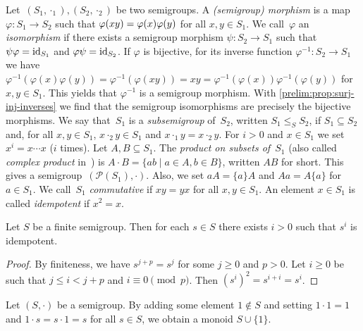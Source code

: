 \label{def:subsemigroup}
\label{def:product_subsets} 
Let~$(S_1,\cdot_1), (S_2,\cdot_2)$ be two semigroups. 
A \emph{(semigroup) morphism} 
is a map $\varphi \colon S_1 \to S_2$ such that $\varphi(xy) = \varphi(x) \varphi(y)$ 
for all $x,y \in S_1$. We call~$\varphi$ an \emph{isomorphism} if there exists a semigroup morphism
$\psi \colon S_2 \to S_1$ such that $\psi \varphi = \operatorname{id}_{S_1}$
and $\varphi \psi = \operatorname{id}_{S_2}$.
If $\varphi$ is bijective, for its inverse function $\varphi^{-1} \colon S_2 \to S_1$
we have $\varphi^{-1}(\varphi(x)\varphi(y))
= \varphi^{-1}(\varphi(xy)) = xy = \varphi^{-1}(\varphi(x)) \varphi^{-1}(\varphi(y))$ for $x,y \in S_1$.
This yields that $\varphi^{-1}$ is a semigroup morphism.
With \cref{prelim:prop:surj-inj-inverses} 
we find that the semigroup isomorphisms are precisely the bijective morphisms.
We say that~$S_1$ is a \emph{subsemigroup}
of~$S_2$, written $S_1 \le_S S_2$,
if $S_1 \subseteq S_2$ and, for all $x,y\in S_1$,
$x \cdot_2 y \in S_1$ and $x \cdot_1 y = x \cdot_2 y$.
For $i > 0$ and $x \in S_1$ we set $x^i = x\cdots x$ ($i$ times).
Let $A,B \subseteq S_1$. The
\emph{product on subsets of~$S_1$} (also called \emph{complex product} in~\cite{Kurzweil04})
is $A \cdot B = \{ ab \mid a \in A, b \in B\}$, written $AB$ for short.
This gives a semigroup~$(\mathcal P(S_1), \cdot)$.
Also, we set $aA = \{a\}A$ and $Aa = A\{a\}$ for $a \in S_1$.
We call~$S_1$ \emph{commutative} if $xy = yx$ for all $x,y \in S_1$.
An element $x \in S_1$ is called \emph{idempotent} if $x^2 = x$.

\begin{lemma} \label{prelim:lem:finite-semigrp-idempotent-power}
	Let $S$ be a finite semigroup. Then for each $s \in S$
	there exists $i > 0$ such that $s^i$
	is idempotent.
\end{lemma}
\begin{proof}
	By finiteness, we have $s^{j + p} = s^j$
	for some $j \ge 0$ and $p > 0$.
	Let $i \ge 0$ be such that $j \le i < j + p$ and $i \equiv 0 \pmod{p}$.
	Then $(s^{i})^2 = s^{i+i} = s^i$.
\end{proof}

\begin{remark} \label{prelim:rem:semigroup-adjoin-identity}
	Let $(S, \cdot)$ be a semigroup.
	By adding some element $1 \notin S$
	and setting $1\cdot 1 = 1$ and $1\cdot s = s\cdot 1 = s$ for all $s \in S$,
	we obtain a monoid $S \cup \{1\}$.	
\end{remark}

